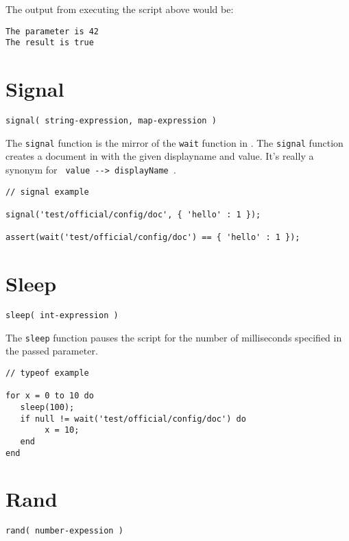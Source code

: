 The output from executing the script above would be:
\begin{Verbatim}
The parameter is 42
The result is true
\end{Verbatim}

\section{Signal}

\begin{Verbatim}
signal( string-expression, map-expression )
\end{Verbatim}

The \Verb+signal+ function is the mirror of the \verb+wait+ function in \Reflex. The \verb+signal+ function creates a document in \Rapture with the given displayname and value. It's really a synonym for \verb+ value --> displayName +.

\begin{lstlisting}[caption={Signal example}]
// signal example

signal('test/official/config/doc', { 'hello' : 1 });

assert(wait('test/official/config/doc') == { 'hello' : 1 });

\end{lstlisting}

\section{Sleep}

\begin{Verbatim}
sleep( int-expression )
\end{Verbatim}

The \Verb+sleep+ function pauses the \Reflex script for the number of milliseconds specified in the passed parameter.

\begin{lstlisting}[caption={Sleep example}]
// typeof example

for x = 0 to 10 do
   sleep(100);
   if null != wait('test/official/config/doc') do
        x = 10;
   end
end

\end{lstlisting}

\section{Rand}

\begin{Verbatim}
rand( number-expession )
\end{Verbatim}

